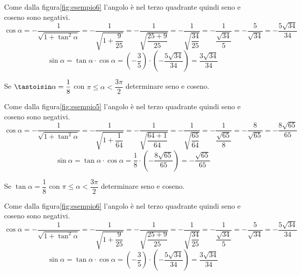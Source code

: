 Come dalla figura\nobs\vref{fig:esempio6} l'angolo è nel terzo quadrante quindi seno e coseno sono negativi.
\[\cos\alpha=-\dfrac{1}{\sqrt{1+\tan^2\alpha}}=-\dfrac{1}{\sqrt{1+\dfrac{9}{25}}}=-\dfrac{1}{\sqrt{\dfrac{25+9}{25}}}=-\dfrac{1}{\sqrt{\dfrac{34}{25}}}=-\dfrac{1}{\dfrac{\sqrt{34}}{5}}=-\dfrac{5}{\sqrt{34}}=-\dfrac{5\sqrt{34}}{34} \]
\[\sin\alpha=\tan\alpha\cdot\cos\alpha=\left(-\dfrac{3}{5}\right)\cdot\left(-\dfrac{5\sqrt{34}}{34}\right)=\dfrac{3\sqrt{34}}{34} \]
\begin{esempiot}{}{}
	Se $\tastoisin\alpha=\dfrac{1}{8}$ con $\pi\leq\alpha<\dfrac{3\pi}{2}$ determinare seno e coseno.
\end{esempiot}
Come dalla figura\nobs\vref{fig:esempio5} l'angolo è nel terzo quadrante quindi seno e coseno sono negativi.
\[\cos\alpha=-\dfrac{1}{\sqrt{1+\tan^2\alpha}}=-\dfrac{1}{\sqrt{1+\dfrac{1}{64}}}=-\dfrac{1}{\sqrt{\dfrac{64+1}{64}}}=-\dfrac{1}{\sqrt{\dfrac{65}{64}}}=-\dfrac{1}{\dfrac{\sqrt{65}}{8}}=-\dfrac{8}{\sqrt{65}}=-\dfrac{8\sqrt{65}}{65} \]
\[\sin\alpha=\tan\alpha\cdot\cos\alpha=\dfrac{1}{8}\cdot\left(-\dfrac{8\sqrt{65}}{65}\right)=-\dfrac{\sqrt{65}}{65} \]
\begin{esempiot}{}{}
	Se $\tan\alpha=\dfrac{1}{8}$ con $\pi\leq\alpha<\dfrac{3\pi}{2}$ determinare seno e coseno.
\end{esempiot}
Come dalla figura\nobs\vref{fig:esempio6} l'angolo è nel terzo quadrante quindi seno e coseno sono negativi.
\[\cos\alpha=-\dfrac{1}{\sqrt{1+\tan^2\alpha}}=-\dfrac{1}{\sqrt{1+\dfrac{9}{25}}}=-\dfrac{1}{\sqrt{\dfrac{25+9}{25}}}=-\dfrac{1}{\sqrt{\dfrac{34}{25}}}=-\dfrac{1}{\dfrac{\sqrt{34}}{5}}=-\dfrac{5}{\sqrt{34}}=-\dfrac{5\sqrt{34}}{34} \]
\[\sin\alpha=\tan\alpha\cdot\cos\alpha=\left(-\dfrac{3}{5}\right)\cdot\left(-\dfrac{5\sqrt{34}}{34}\right)=\dfrac{3\sqrt{34}}{34} \]
